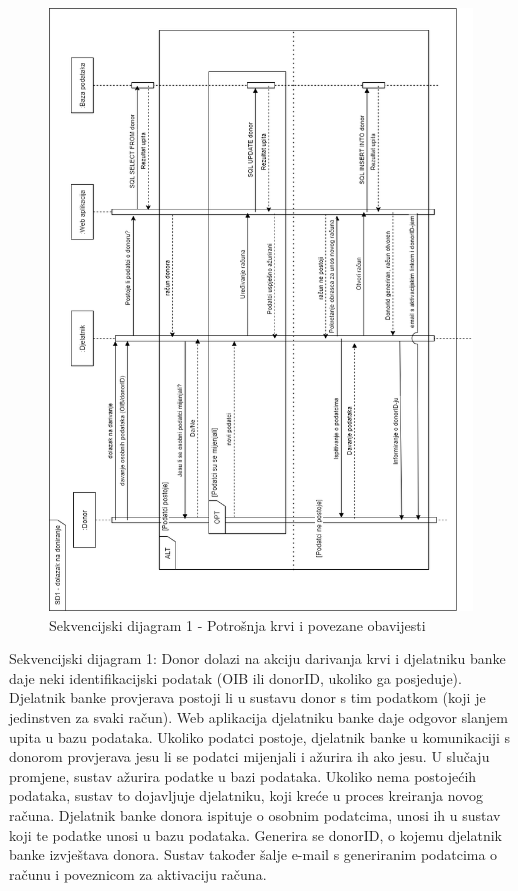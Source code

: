 				
				\begin{figure}[H]
    			\includegraphics[scale=0.7]{slike/SD1_rot.png} %
    			\centering
    			\caption{Sekvencijski dijagram 1 - Potrošnja krvi i povezane obavijesti}
    			\label{fig:promjene}
    	    	\end{figure}
    	    	
    	    	\par {
    	    	    Sekvencijski dijagram 1: Donor dolazi na akciju darivanja krvi i djelatniku banke daje neki 
identifikacijski podatak (OIB ili donorID, ukoliko ga posjeduje).
Djelatnik banke provjerava postoji li u sustavu donor s tim podatkom (koji je
jedinstven za svaki račun). Web aplikacija djelatniku banke daje odgovor slanjem
upita u bazu podataka. Ukoliko podatci postoje, djelatnik banke u komunikaciji s 
donorom provjerava jesu li se podatci mijenjali i ažurira ih ako jesu.
U slučaju promjene, sustav ažurira podatke u bazi podataka.
Ukoliko nema postojećih podataka, sustav to dojavljuje djelatniku, koji kreće
u proces kreiranja novog računa. Djelatnik banke donora ispituje o osobnim podatcima,
unosi ih u sustav koji te podatke unosi u bazu podataka. Generira se donorID,
o kojemu djelatnik banke izvještava donora. Sustav također šalje e-mail s generiranim
podatcima o računu i poveznicom za aktivaciju računa.
    	    	}
    	    	
